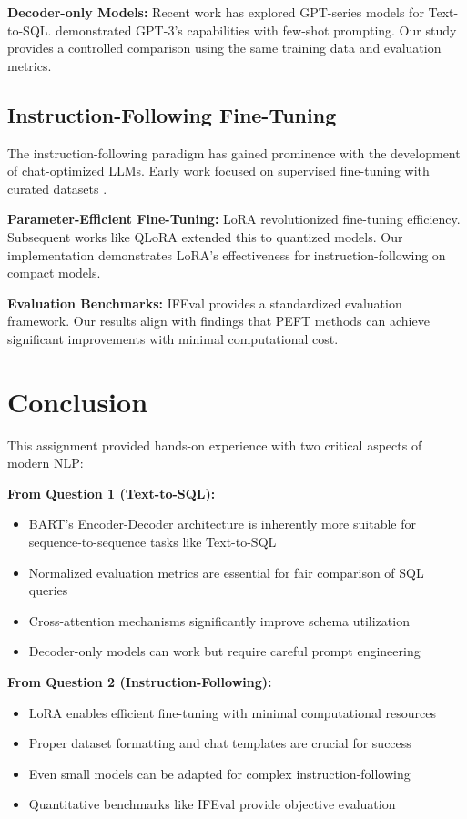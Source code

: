 \documentclass[conference]{IEEEtran}
\begin{document}
\textbf{Decoder-only Models:} Recent work has explored GPT-series models for Text-to-SQL. \cite{rajkumar2022evaluating} demonstrated GPT-3's capabilities with few-shot prompting. Our study provides a controlled comparison using the same training data and evaluation metrics.

\subsection{Instruction-Following Fine-Tuning}
The instruction-following paradigm has gained prominence with the development of chat-optimized LLMs. Early work focused on supervised fine-tuning with curated datasets \cite{ouyang2022training}.

\textbf{Parameter-Efficient Fine-Tuning:} LoRA \cite{hu2021lora} revolutionized fine-tuning efficiency. Subsequent works like QLoRA \cite{dettmers2023qlora} extended this to quantized models. Our implementation demonstrates LoRA's effectiveness for instruction-following on compact models.

\textbf{Evaluation Benchmarks:} IFEval \cite{zhou2023instruction} provides a standardized evaluation framework. Our results align with findings that PEFT methods can achieve significant improvements with minimal computational cost.

\section{Conclusion}
This assignment provided hands-on experience with two critical aspects of modern NLP:

\textbf{From Question 1 (Text-to-SQL):}
\begin{itemize}
    \item BART's Encoder-Decoder architecture is inherently more suitable for sequence-to-sequence tasks like Text-to-SQL
    \item Normalized evaluation metrics are essential for fair comparison of SQL queries
    \item Cross-attention mechanisms significantly improve schema utilization
    \item Decoder-only models can work but require careful prompt engineering
\end{itemize}

\textbf{From Question 2 (Instruction-Following):}
\begin{itemize}
    \item LoRA enables efficient fine-tuning with minimal computational resources
    \item Proper dataset formatting and chat templates are crucial for success
    \item Even small models can be adapted for complex instruction-following
    \item Quantitative benchmarks like IFEval provide objective evaluation
\end{itemize}
\end{document}

